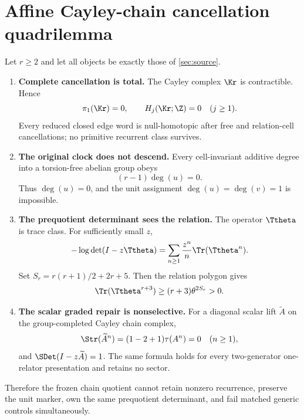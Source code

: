\section{Affine Cayley-chain cancellation quadrilemma}
\label{sec:theorem}

\begin{theorem}
\label{thm:quadrilemma}
Let $r\ge2$ and let all objects be exactly those of \cref{sec:source}.
\begin{enumerate}
\item \textbf{Complete cancellation is total.}
The Cayley complex $\Kr$ is contractible.  Hence
\begin{equation}
\pi_1(\Kr)=0,
\qquad
H_j(\Kr;\Z)=0\quad(j\ge1).
\label{eq:contractible}
\end{equation}
Every reduced closed edge word is null-homotopic after free and relation-cell
cancellations; no primitive recurrent class survives.

\item \textbf{The original clock does not descend.}
Every cell-invariant additive degree into a torsion-free abelian group obeys
\begin{equation}
(r-1)\deg(u)=0.
\label{eq:marker-obstruction}
\end{equation}
Thus $\deg(u)=0$, and the unit assignment $\deg(u)=\deg(v)=1$ is impossible.

\item \textbf{The prequotient determinant sees the relation.}
The operator $\Ttheta$ is trace class.  For sufficiently small $z$,
\begin{equation}
-\log\det(I-z\Ttheta)
=\sum_{n\ge1}\frac{z^n}{n}\Tr(\Ttheta^n).
\label{eq:fredholm-log}
\end{equation}
Set $S_r=r(r+1)/2+2r+5$.  Then the relation polygon gives
\nopagebreak[4]
\begin{equation}
\Tr(\Ttheta^{r+3})\ge(r+3)\theta^{2S_r}>0.
\label{eq:positive-trace}
\end{equation}

\item \textbf{The scalar graded repair is nonselective.}
For a diagonal scalar lift $\widetilde A$ on the group-completed Cayley chain
complex,
\begin{equation}
\Str(\widetilde A^n)=(1-2+1)\tau(A^n)=0
\quad(n\ge1),
\label{eq:supertrace}
\end{equation}
and $\SDet(I-z\widetilde A)=1$.  The same formula holds for every
two-generator one-relator presentation and retains no sector.
\end{enumerate}
Therefore the frozen chain quotient cannot retain nonzero recurrence,
preserve the unit marker, own the same prequotient determinant, and fail
matched generic controls simultaneously.
\end{theorem}

